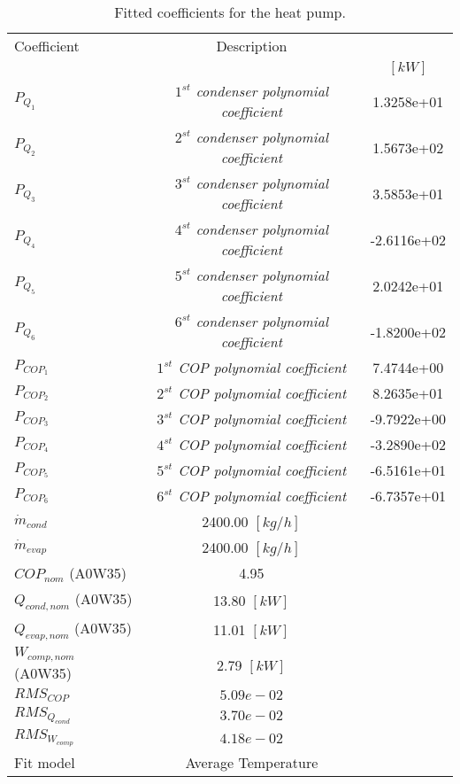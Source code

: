 \documentclass[english]{SPFShortReport}
\author{Dani Carbonell}
\begin{document}
\begin{table}[!ht]
\begin{small}
\caption{Fitted coefficients for the heat pump.}
\begin{center}
\resizebox{12cm}{!} 
{
\begin{tabular}{l | c c } 
\hline
\hline
Coefficient &Description & \\ 
 & &$[kW]$\\ 
\hline
$P_{Q_{1}}$ & \emph{$1^{st}$ condenser polynomial coefficient}  & 1.3258e+01    \\ 
$P_{Q_{2}}$ & \emph{$2^{st}$ condenser polynomial coefficient}  & 1.5673e+02    \\ 
$P_{Q_{3}}$ & \emph{$3^{st}$ condenser polynomial coefficient}  & 3.5853e+01    \\ 
$P_{Q_{4}}$ & \emph{$4^{st}$ condenser polynomial coefficient}  & -2.6116e+02    \\ 
$P_{Q_{5}}$ & \emph{$5^{st}$ condenser polynomial coefficient}  & 2.0242e+01    \\ 
$P_{Q_{6}}$ & \emph{$6^{st}$ condenser polynomial coefficient}  & -1.8200e+02    \\ 
\hline
$P_{COP_{1}}$ & \emph{$1^{st}$ COP polynomial coefficient}  & 7.4744e+00    \\ 
$P_{COP_{2}}$ & \emph{$2^{st}$ COP polynomial coefficient}  & 8.2635e+01    \\ 
$P_{COP_{3}}$ & \emph{$3^{st}$ COP polynomial coefficient}  & -9.7922e+00    \\ 
$P_{COP_{4}}$ & \emph{$4^{st}$ COP polynomial coefficient}  & -3.2890e+02    \\ 
$P_{COP_{5}}$ & \emph{$5^{st}$ COP polynomial coefficient}  & -6.5161e+01    \\ 
$P_{COP_{6}}$ & \emph{$6^{st}$ COP polynomial coefficient}  & -6.7357e+01    \\ 
\hline
$\dot m_{cond}$ & 2400.00 $[kg/h]$ \\ 
$\dot m_{evap}$ & 2400.00 $[kg/h]$ \\ 
\hline
$COP_{nom}$ (A0W35)& 4.95 \\ 
$Q_{cond,nom}$ (A0W35)& 13.80 $[kW]$\\ 
$Q_{evap,nom}$ (A0W35)& 11.01 $[kW]$\\ 
$W_{comp,nom}$ (A0W35)& 2.79 $[kW]$\\ 
\hline
 $RMS_{COP}$ & $5.09e-02$ \\ 
 $RMS_{Q_{cond}}$ & $3.70e-02$ \\ 
 $RMS_{W_{comp}}$ & $4.18e-02$ \\ 
\hline
Fit model & Average Temperature\\ 
\hline
\hline
\end{tabular}
}
\label{CoefTable}
\end{center}
\end{small}
\end{table}
\end{document}
